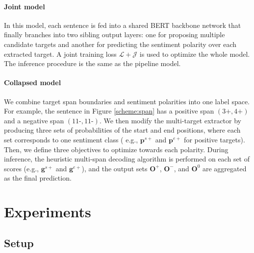 \documentclass[11pt,a4paper]{article}
\begin{document}
\paragraph{Joint model} 
In this model, each sentence is fed into a shared BERT backbone network that finally branches into two sibling output layers: one for proposing multiple candidate targets and another for predicting the sentiment polarity over each extracted target.
A joint training loss $\mathcal{L} + \mathcal{J}$ is used to optimize the whole model.
The inference procedure is the same as the pipeline model.

\paragraph{Collapsed model}
We combine target span boundaries and sentiment polarities into one label space. 
For example, the sentence in Figure \ref{scheme:span} has a positive span $(3\text{+}, 4\text{+})$ and a negative span $(11\text{-}, 11\text{-})$.
We then modify the multi-target extractor by producing three sets of probabilities of the start and end positions, where each set corresponds to one sentiment class ( e.g., $\mathbf{p}^{s+}$ and $\mathbf{p}^{e+}$ for positive targets).
Then, we define three objectives to optimize towards each polarity.
During inference, the heuristic multi-span decoding algorithm is performed on each set of scores (e.g., $\mathbf{g}^{s+}$ and $\mathbf{g}^{e+}$), and the output sets $\mathbf{O}^+$, $\mathbf{O}^-$, and $\mathbf{O}^0$ are aggregated as the final prediction. \section{Experiments}


\subsection{Setup}

\begin{table}
\begin{center}
\caption{\label{table:data} Dataset statistics. `\#Sent' and `\#Targets' denote the number of sentences and targets, respectively. `+', `-', and `0' refer to the positive, negative, and neutral sentiment classes.}
\end{center}
\end{table}
\end{document}
